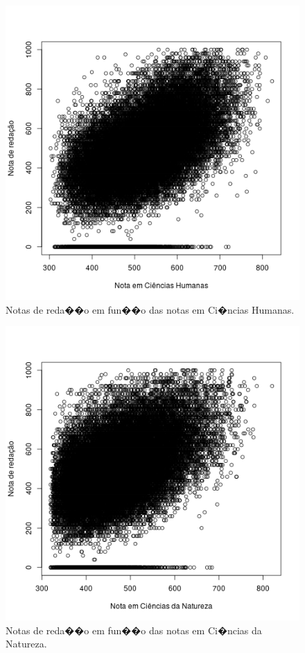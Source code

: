 \documentclass[12pt]{article}
\begin{document}
\begin{minipage}{.5\textwidth}
    \begin{figure}[H]
    \centering\includegraphics[width=\linewidth]{../correlacao_nota_ch.png}
    \caption{Notas de reda��o em fun��o das notas em Ci�ncias Humanas.}
    \label{fig:correlacao-nota-ch}
    \end{figure}
\end{minipage}%
\begin{minipage}{.5\textwidth}
    \begin{figure}[H]
    \centering\includegraphics[width=\linewidth]{../correlacao_nota_cn.png}
    \caption{Notas de reda��o em fun��o das notas em Ci�ncias da Natureza.}
    \label{fig:correlacao-nota-cn}
    \end{figure}
\end{minipage}
\end{document}
